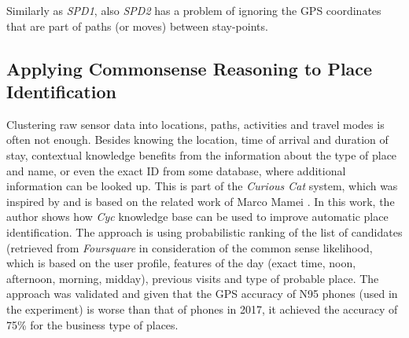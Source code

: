 Similarly as \emph{SPD1}, also \emph{SPD2} has a problem of ignoring the GPS 
coordinates that are part of paths (or moves) between stay-points.

\subsection{Applying Commonsense Reasoning to Place Identification}
\label{section:MarcoMamei}
Clustering raw sensor data into locations, paths, activities and travel modes
is often not enough. Besides knowing the location, time of arrival and duration
of stay, contextual knowledge benefits from the information about the type of
place and name, or even the exact ID from some database, where additional 
information can be looked up. This is part of the \emph{Curious Cat} system, 
which was inspired by and is based on the related work of Marco 
Mamei \parencite{Mamei2010}. In this work, the author shows how \emph{Cyc} knowledge base can be used to
improve automatic place identification. The approach is using probabilistic
ranking of the list of candidates (retrieved from \emph{Foursquare} in consideration
of the common sense likelihood, which is based on the user profile, features of
the day (exact time, noon, afternoon, morning, midday), previous visits
and type of probable place. The approach was validated and given that the
GPS accuracy of N95 phones (used in the experiment) is worse than that of phones
in 2017, it achieved the accuracy of 75\% for the business type of places.
